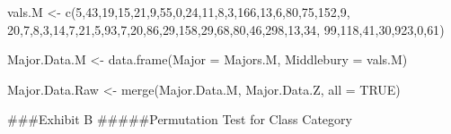 \documentclass[
]{article}
\newenvironment{Shaded}{\begin{snugshade}}{\end{snugshade}}
\newcommand{\AttributeTok}[1]{\textcolor[rgb]{0.77,0.63,0.00}{#1}}
\newcommand{\ConstantTok}[1]{\textcolor[rgb]{0.00,0.00,0.00}{#1}}
\newcommand{\DecValTok}[1]{\textcolor[rgb]{0.00,0.00,0.81}{#1}}
\newcommand{\FunctionTok}[1]{\textcolor[rgb]{0.00,0.00,0.00}{#1}}
\newcommand{\NormalTok}[1]{#1}
\newcommand{\OtherTok}[1]{\textcolor[rgb]{0.56,0.35,0.01}{#1}}
\begin{document}
\begin{Shaded}
\begin{Highlighting}[]
\NormalTok{vals.M }\OtherTok{\textless{}{-}} \FunctionTok{c}\NormalTok{(}\DecValTok{5}\NormalTok{,}\DecValTok{43}\NormalTok{,}\DecValTok{19}\NormalTok{,}\DecValTok{15}\NormalTok{,}\DecValTok{21}\NormalTok{,}\DecValTok{9}\NormalTok{,}\DecValTok{55}\NormalTok{,}\DecValTok{0}\NormalTok{,}\DecValTok{24}\NormalTok{,}\DecValTok{11}\NormalTok{,}\DecValTok{8}\NormalTok{,}\DecValTok{3}\NormalTok{,}\DecValTok{166}\NormalTok{,}\DecValTok{13}\NormalTok{,}\DecValTok{6}\NormalTok{,}\DecValTok{80}\NormalTok{,}\DecValTok{75}\NormalTok{,}\DecValTok{152}\NormalTok{,}\DecValTok{9}\NormalTok{,}
                \DecValTok{20}\NormalTok{,}\DecValTok{7}\NormalTok{,}\DecValTok{8}\NormalTok{,}\DecValTok{3}\NormalTok{,}\DecValTok{14}\NormalTok{,}\DecValTok{7}\NormalTok{,}\DecValTok{21}\NormalTok{,}\DecValTok{5}\NormalTok{,}\DecValTok{93}\NormalTok{,}\DecValTok{7}\NormalTok{,}\DecValTok{20}\NormalTok{,}\DecValTok{86}\NormalTok{,}\DecValTok{29}\NormalTok{,}\DecValTok{158}\NormalTok{,}\DecValTok{29}\NormalTok{,}\DecValTok{68}\NormalTok{,}\DecValTok{80}\NormalTok{,}\DecValTok{46}\NormalTok{,}\DecValTok{298}\NormalTok{,}\DecValTok{13}\NormalTok{,}\DecValTok{34}\NormalTok{,}
                \DecValTok{99}\NormalTok{,}\DecValTok{118}\NormalTok{,}\DecValTok{41}\NormalTok{,}\DecValTok{30}\NormalTok{,}\DecValTok{923}\NormalTok{,}\DecValTok{0}\NormalTok{,}\DecValTok{61}\NormalTok{)}
                
\NormalTok{Major.Data.M }\OtherTok{\textless{}{-}} \FunctionTok{data.frame}\NormalTok{(}\AttributeTok{Major =}\NormalTok{ Majors.M,}
                           \AttributeTok{Middlebury =}\NormalTok{ vals.M)}

\NormalTok{Major.Data.Raw }\OtherTok{\textless{}{-}} \FunctionTok{merge}\NormalTok{(Major.Data.M, Major.Data.Z, }\AttributeTok{all =} \ConstantTok{TRUE}\NormalTok{)}
\end{Highlighting}
\end{Shaded}

\#\#\#Exhibit B \#\#\#\#\#Permutation Test for Class Category
\end{document}
